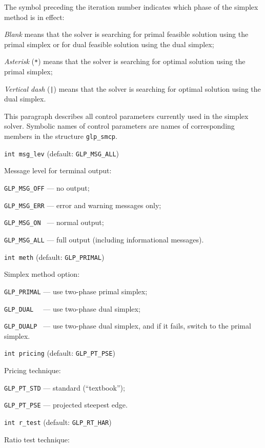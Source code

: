 The symbol preceding the iteration number indicates which phase of the
simplex method is in effect:

{\it Blank} means that the solver is searching for primal feasible
solution using the primal simplex or for dual feasible solution using
the dual simplex;

{\it Asterisk} (\verb|*|) means that the solver is searching for
optimal solution using the primal simplex;

{\it Vertical dash} (\verb/|/) means that the solver is searching for
optimal solution using the dual simplex.


This paragraph describes all control parameters currently used in the
simplex solver. Symbolic names of control parameters are names of
corresponding members in the structure \verb|glp_smcp|.

\bigskip

{\tt int msg\_lev} (default: {\tt GLP\_MSG\_ALL})

Message level for terminal output:

\verb|GLP_MSG_OFF| --- no output;

\verb|GLP_MSG_ERR| --- error and warning messages only;

\verb|GLP_MSG_ON | --- normal output;

\verb|GLP_MSG_ALL| --- full output (including informational messages).

\bigskip

{\tt int meth} (default: {\tt GLP\_PRIMAL})

Simplex method option:

\verb|GLP_PRIMAL| --- use two-phase primal simplex;

\verb|GLP_DUAL  | --- use two-phase dual simplex;

\verb|GLP_DUALP | --- use two-phase dual simplex, and if it fails,
switch to the primal simplex.

\bigskip

{\tt int pricing} (default: {\tt GLP\_PT\_PSE})

Pricing technique:

\verb|GLP_PT_STD| --- standard (``textbook'');

\verb|GLP_PT_PSE| --- projected steepest edge.

\bigskip

{\tt int r\_test} (default: {\tt GLP\_RT\_HAR})

Ratio test technique:

